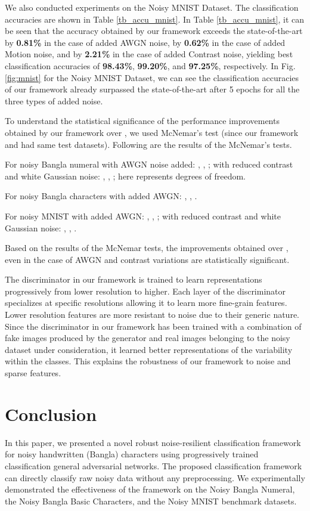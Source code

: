 \documentclass[runningheads]{llncs}
\begin{document}
We also conducted experiments on the Noisy MNIST Dataset.  The classification accuracies  are shown in Table \ref{tb_accu_mnist}. In  Table \ref{tb_accu_mnist}, it can be seen that the accuracy obtained by our framework exceeds the state-of-the-art by \textbf{0.81\%} in the case of added AWGN noise, by \textbf{0.62\%} in the case of added  Motion noise, and by \textbf{2.21\%} in the case of added  Contrast noise, yielding best classification accuracies of \textbf{98.43\%}, \textbf{99.20\%}, and \textbf{97.25\%}, respectively. In Fig.\ref{fig:mnist} for  the Noisy MNIST Dataset, we can see the classification accuracies of our framework already  surpassed the state-of-the-art  after 5 epochs for all the three types of added noise. 

To understand the statistical significance of the performance improvements obtained by our framework over \cite{Karki18}, we used McNemar’s test   (since our framework and \cite{Karki18} had same test datasets).  Following are the results of the McNemar’s tests. 

For noisy Bangla numeral with AWGN noise added: , , ; with reduced contrast and white Gaussian noise: , , ; here  represents degrees of freedom.  


For noisy Bangla characters with added AWGN: , , .


 For noisy MNIST with added AWGN: , , ; with reduced contrast and white Gaussian noise: , , . 

 
Based on the results of the McNemar tests, the improvements obtained over \cite{Karki18}, even in the case of AWGN and contrast variations are statistically significant. 



 The discriminator in our framework is trained  to learn representations  progressively from lower resolution to higher. Each layer of the discriminator
specializes at specific resolutions allowing it to learn more
fine-grain features. Lower resolution features are more resistant to noise due to their generic nature. 
Since the discriminator in our framework  has been trained with a combination of fake images produced by the generator and real images belonging to the  noisy dataset under consideration, it learned better representations of the variability within the classes.   This explains the robustness of our framework to noise and sparse features. 

\section{Conclusion}\label{con}

In this paper, we presented a novel robust noise-resilient classification framework for noisy handwritten (Bangla) characters  using  progressively trained  classification general adversarial networks.
The proposed classification  framework can directly classify raw noisy data without any preprocessing.
 We  experimentally demonstrated the effectiveness of the framework on the Noisy Bangla Numeral, the Noisy Bangla  Basic Characters, and the Noisy MNIST benchmark datasets.


\end{document}
